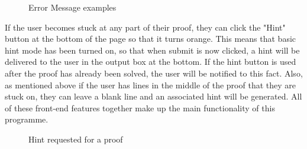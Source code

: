 \begin{figure}[!ht]
	\centering
	\caption{Error Message examples}
\end{figure}

If the user becomes stuck at any part of their proof, they can click the "Hint" button at the bottom of the page so that it turns orange. This means that basic hint mode has been turned on, so that when submit is now clicked, a hint will be delivered to the user in the output box at the bottom. If the hint button is used after the proof has already been solved, the user will be notified to this fact. Also, as mentioned above if the user has lines in the middle of the proof that they are stuck on, they can leave a blank line and an associated hint will be generated. All of these front-end features together make up the main functionality of this programme.
\pagebreak

\begin{figure}[!ht]
	\centering
	\caption{Hint requested for a proof}
\end{figure}



